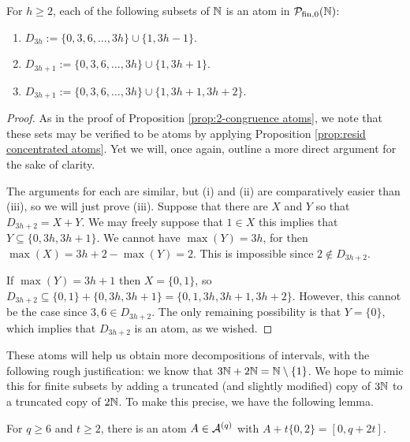 \begin{prop} \label{prop:3-congruence atoms}
	For $h\ge 2$, each of the following subsets of $\mathbb{N}$ is an atom in ${\mathcal{P}_{\textrm{fin},0}(\mathbb{N})}$:
	\begin{enumerate}[label={\rm (\roman{*})}]
		\item $D_{3h} := \{0,3,6,\dots, 3h\} \cup \{ 1, 3h-1 \}$.
		\item $D_{3h+1} := \{0,3,6,\dots, 3h\} \cup \{ 1, 3h+1 \}$.
		\item $D_{3h+1} := \{0,3,6,\dots, 3h\} \cup \{ 1, 3h+1, 3h+2 \}$.
	\end{enumerate}
\end{prop}

\begin{proof}
	As in the proof of Proposition \ref{prop:2-congruence atoms}, we note that these sets may be verified to be atoms by applying Proposition \ref{prop:resid concentrated atoms}.
	Yet we will, once again, outline a more direct argument for the sake of clarity.
	
	The arguments for each are similar, but (i) and (ii) are comparatively easier than (iii), so we will just prove (iii).
	Suppose that there are $X$ and $Y$ so that $D_{3h+2} = X + Y$.
	We may freely suppose that $1\in X$ this implies that $Y \subseteq \{0,3h,3h+1\}$.
	We cannot have $\max(Y) = 3h$, for then $\max(X) = 3h+2 - \max(Y) = 2$.
	This is impossible since $2\notin D_{3h+2}$.
	
	If $\max(Y) = 3h+1$ then $X = \{0,1\}$, so $D_{3h+2} \subseteq \{0,1\} + \{0,3h,3h+1\} = \{0,1,3h,3h+1,3h+2\}$.
	However, this cannot be the case since $3,6\in D_{3h+2}$.
	The only remaining possibility is that $Y = \{0\}$, which implies that $D_{3h+2}$ is an atom, as we wished.
\end{proof}

These atoms will help us obtain more decompositions of intervals, with the following rough justification: we know that $3\mathbb{N} + 2\mathbb{N} = \mathbb{N} \setminus\{1\}$. 
We hope to mimic this for finite subsets by adding a truncated (and slightly modified) copy of $3\mathbb{N}$ to a truncated copy of $2\mathbb{N}$.
To make this precise, we have the following lemma.

\begin{lemma} \label{lemma:many 2s types}
	For $q \ge 6$ and $t\ge 2$, there is an atom $A\in \mathcal{A}^{(q)}$ with $A + t\{0,2\} = [ 0, q+2t ]$.
\end{lemma}

